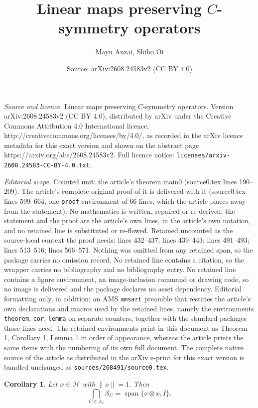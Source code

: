 \documentclass[10pt,a4paper]{amsart}
\title{Linear maps preserving $C$-symmetry operators}
\author{Mayu Anzai, Shiho Oi}
\date{Source: arXiv:2608.24583v2 (CC BY 4.0)}
\newtheorem{cor}{Corollary}
\newcommand{\SC}{\mathcal{S}_C}
\newcommand{\Span}{\operatorname{span}}
\newcommand{\cH}{{\mathcal{H}}}
\begin{document}
\maketitle

\noindent\emph{Source and licence.} Linear maps preserving $C$-symmetry operators. Version arXiv:2608.24583v2 (CC BY 4.0), distributed by arXiv under the Creative Commons Attribution 4.0 International licence, http://creativecommons.org/licenses/by/4.0/, as recorded in the arXiv licence metadata for this exact version and shown on the abstract page https://arxiv.org/abs/2608.24583v2. Full licence notice: \texttt{licenses/arxiv-2608.24583-CC-BY-4.0.txt}.\par\smallskip

\noindent\textit{Editorial scope.} Counted unit: the article's theorem main0 (source0.tex lines 190--209). The article's complete original proof of it is delivered with it (source0.tex lines 599--664, one \texttt{proof} environment of 66 lines, which the article places away from the statement). No mathematics is written, repaired or re-derived: the statement and the proof are the article's own lines, in the article's own notation, and no retained line is substituted or re-flowed.  Retained uncounted as the source-local context the proof needs: lines 432--437; lines 439--443; lines 491--493; lines 513--516; lines 566--571.  Nothing was omitted from any retained span, so the package carries no omission record.  No retained line contains a citation, so the wrapper carries no bibliography and no bibliography entry.  No retained line contains a figure environment, an image-inclusion command or drawing code, so no image is delivered and the package declares no asset dependency.  Editorial formatting only, in addition: an AMS \texttt{amsart} preamble that restates the article's own declarations and macros used by the retained lines, namely the environments \texttt{theorem}, \texttt{cor}, \texttt{lemma} on separate counters, together with the standard packages those lines need.  The retained environments print in this document as Theorem 1, Corollary 1, Lemma 1 in order of appearance, whereas the article prints the same items with the numbering of its own full document.  The complete native source of the article as distributed in the arXiv e-print for this exact version is bundled unchanged as \texttt{sources/208491/source0.tex}.
\begin{cor}\label{dim2o}
Let $x \in \cH$ with $\|x\|=1$. Then 
\[
\bigcap_{C \in \Lambda_x} \SC=\Span\{x\otimes x, I\}.
\]
\end{cor}
\end{document}
